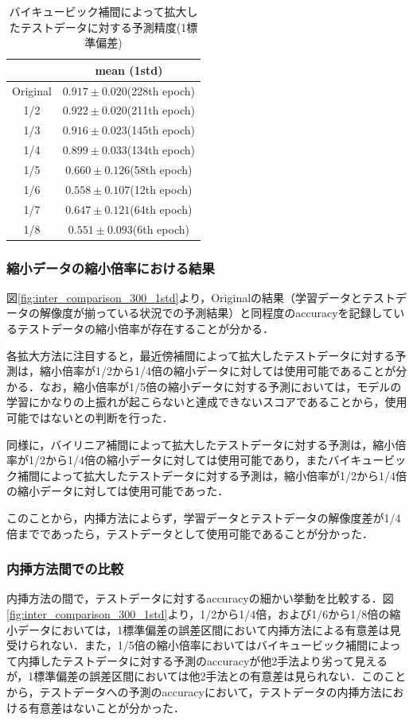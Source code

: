 \documentclass[a4j, 11pt]{jreport}
\begin{document}
\begin{table}[H]
  \centering
	\caption{バイキュービック補間によって拡大したテストデータに対する予測精度(1標準偏差)}
  \begin{tabular}{|c|c|}
		\hline
    & mean (1std) \\ \hline
    Original & $0.917 \pm 0.020$(228th epoch) \\ \hline
    1/2 & $0.922 \pm 0.020$(211th epoch) \\ \hline
    1/3 & $0.916 \pm 0.023$(145th epoch) \\ \hline
    1/4 & $0.899 \pm 0.033$(134th epoch) \\ \hline
    1/5 & $0.660 \pm 0.126$(58th epoch) \\ \hline
    1/6 & $0.558 \pm 0.107$(12th epoch) \\ \hline
    1/7 & $0.647 \pm 0.121$(64th epoch) \\ \hline
    1/8 & $0.551 \pm 0.093$(6th epoch) \\ \hline
  \end{tabular}
  \label{tb:accs_4_2_cubic_1std}
\end{table}

\subsubsection{縮小データの縮小倍率における結果}
図\ref{fig:inter_comparison_300_1std}より，Originalの結果（学習データとテストデータの解像度が揃っている状況での予測結果）と同程度のaccuracyを記録しているテストデータの縮小倍率が存在することが分かる．

各拡大方法に注目すると，最近傍補間によって拡大したテストデータに対する予測は，縮小倍率が1/2から1/4倍の縮小データに対しては使用可能であることが分かる．なお，縮小倍率が1/5倍の縮小データに対する予測においては，モデルの学習にかなりの上振れが起こらないと達成できないスコアであることから，使用可能ではないとの判断を行った．

同様に，バイリニア補間によって拡大したテストデータに対する予測は，縮小倍率が1/2から1/4倍の縮小データに対しては使用可能であり，またバイキュービック補間によって拡大したテストデータに対する予測は，縮小倍率が1/2から1/4倍の縮小データに対しては使用可能であった．

このことから，内挿方法によらず，学習データとテストデータの解像度差が1/4倍までであったら，テストデータとして使用可能であることが分かった．

\subsubsection{内挿方法間での比較}
内挿方法の間で，テストデータに対するaccuracyの細かい挙動を比較する．図\ref{fig:inter_comparison_300_1std}より，1/2から1/4倍，および1/6から1/8倍の縮小データにおいては，1標準偏差の誤差区間において内挿方法による有意差は見受けられない．また，1/5倍の縮小倍率においてはバイキュービック補間によって内挿したテストデータに対する予測のaccuracyが他2手法より劣って見えるが，1標準偏差の誤差区間においては他2手法との有意差は見られない．このことから，テストデータへの予測のaccuracyにおいて，テストデータの内挿方法における有意差はないことが分かった．
\end{document}
